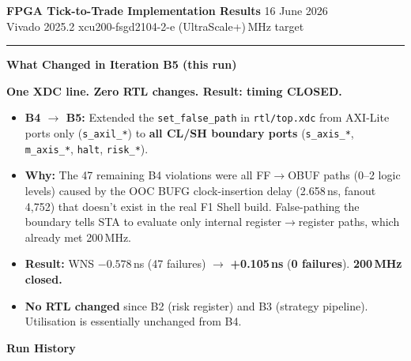 \documentclass[10pt,a4paper]{article}
\begin{document}
{\LARGE\bfseries\color{hdrblue} FPGA Tick-to-Trade \textendash{} Implementation Results}%
\hfill{\small\color{rulegray} 16 June 2026}\\[-2pt]
{\large\color{accentteal}
  Vivado 2025.2\enspace\textbar\enspace
  xcu200-fsgd2104-2-e (UltraScale+)\enspace\textbar{}\,MHz target}

\textcolor{hdrblue}{\rule{\linewidth}{2pt}}

\begin{changebox}
{\large\bfseries\color{newtext} What Changed in Iteration B5 (this run)}

\medskip
\textbf{One XDC line. Zero RTL changes. Result: timing CLOSED.}

\begin{itemize}[leftmargin=1.2em, itemsep=2pt]
  \item \textbf{B4 $\to$ B5:} Extended the \texttt{set\_false\_path} in
        \texttt{rtl/top.xdc} from AXI-Lite ports only (\texttt{s\_axil\_*}) to
        \textbf{all CL/SH boundary ports} (\texttt{s\_axis\_*},
        \texttt{m\_axis\_*}, \texttt{halt}, \texttt{risk\_*}).
  \item \textbf{Why:} The 47 remaining B4 violations were all FF$\to$OBUF paths
        (0--2 logic levels) caused by the OOC BUFG clock-insertion delay
        (2.658\,ns, fanout\,4{,}752) that doesn't exist in the real F1 Shell
        build. False-pathing the boundary tells STA to evaluate only internal
        register$\to$register paths, which already met 200\,MHz.
  \item \textbf{Result:} WNS \textcolor{badred}{$-0.578$\,ns} (47 failures)
        $\longrightarrow$ \textcolor{okgreen}{\textbf{+0.105\,ns}} (\textbf{0
        failures}). \textbf{200\,MHz closed.}
  \item \textbf{No RTL changed} since B2 (risk register) and B3 (strategy
        pipeline). Utilisation is essentially unchanged from B4.
\end{itemize}
\end{changebox}

{\large\bfseries\color{hdrblue} Run History}
\end{document}
